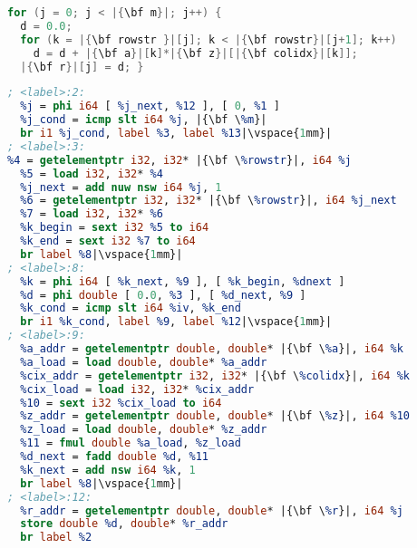 \begin{lstlisting}[escapechar=|,language=C,basicstyle=\linespread{0.75}\small\ttfamily]
for (j = 0; j < |{\bf m}|; j++) {
  d = 0.0;
  for (k = |{\bf rowstr }|[j]; k < |{\bf rowstr}|[j+1]; k++)
    d = d + |{\bf a}|[k]*|{\bf z}|[|{\bf colidx}|[k]];
  |{\bf r}|[j] = d; }
\end{lstlisting}
\vspace{-1em}
\begin{lstlisting}[language={LLVM},escapechar=|,basicstyle=\linespread{0.75}\tiny\ttfamily,
                   label={fig:spmvexample1},caption={Sparse linear algebra in C and LLVM IR}]
; <label>:2:
  %j = phi i64 [ %j_next, %12 ], [ 0, %1 ]
  %j_cond = icmp slt i64 %j, |{\bf \%m}|
  br i1 %j_cond, label %3, label %13|\vspace{1mm}|
; <label>:3:
%4 = getelementptr i32, i32* |{\bf \%rowstr}|, i64 %j
  %5 = load i32, i32* %4
  %j_next = add nuw nsw i64 %j, 1
  %6 = getelementptr i32, i32* |{\bf \%rowstr}|, i64 %j_next
  %7 = load i32, i32* %6
  %k_begin = sext i32 %5 to i64
  %k_end = sext i32 %7 to i64
  br label %8|\vspace{1mm}|
; <label>:8:
  %k = phi i64 [ %k_next, %9 ], [ %k_begin, %dnext ]
  %d = phi double [ 0.0, %3 ], [ %d_next, %9 ]
  %k_cond = icmp slt i64 %iv, %k_end
  br i1 %k_cond, label %9, label %12|\vspace{1mm}|
; <label>:9:
  %a_addr = getelementptr double, double* |{\bf \%a}|, i64 %k
  %a_load = load double, double* %a_addr
  %cix_addr = getelementptr i32, i32* |{\bf \%colidx}|, i64 %k
  %cix_load = load i32, i32* %cix_addr
  %10 = sext i32 %cix_load to i64
  %z_addr = getelementptr double, double* |{\bf \%z}|, i64 %10
  %z_load = load double, double* %z_addr
  %11 = fmul double %a_load, %z_load
  %d_next = fadd double %d, %11
  %k_next = add nsw i64 %k, 1
  br label %8|\vspace{1mm}|
; <label>:12:
  %r_addr = getelementptr double, double* |{\bf \%r}|, i64 %j
  store double %d, double* %r_addr
  br label %2
\end{lstlisting}
\vspace{-0.287cm}

